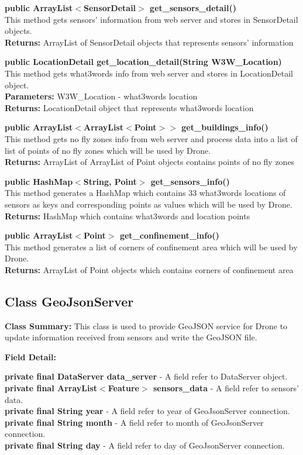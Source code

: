 \documentclass[12pt]{article}
\begin{document}
\textbf{public ArrayList$<$SensorDetail$>$ get\_sensors\_detail()}\\
This method gets sensors' information from web server and stores in SensorDetail objects.\\
\textbf{Returns:} ArrayList of SensorDetail objects that represents sensors' information

\textbf{public LocationDetail get\_location\_detail(String W3W\_Location)}\\
This method gets what3words info from web server and stores in LocationDetail object.\\
\textbf{Parameters:} W3W\_Location - what3words location\\
\textbf{Returns:} LocationDetail object that represents what3words location

\textbf{public ArrayList$<$ArrayList$<$Point$>>$ get\_buildings\_info()}\\
This method gets no fly zones info from web server and process data into a list of list of points of no fly zones which will be used by Drone.\\
\textbf{Returns:} ArrayList of ArrayList of Point objects contains points of no fly zones

\textbf{public HashMap$<$String, Point$>$ get\_sensors\_info()}\\
This method generates a HashMap which contains 33 what3words locations of sensors as keys and corresponding points as values which will be used by Drone.\\
\textbf{Returns:} HashMap which contains what3words and location points

\textbf{public ArrayList$<$Point$>$ get\_confinement\_info()}\\
This method generates a list of corners of confinement area which will be used by Drone.\\
\textbf{Returns:} ArrayList of Point objects which contains corners of confinement area

\subsection {Class GeoJsonServer}
\textbf{Class Summary:} This class is used to provide GeoJSON service for Drone to update information received from sensors and write the GeoJSON file.

\textbf{Field Detail:}

\textbf{private final DataServer data\_server} - A field refer to DataServer object.\\
\textbf{private final ArrayList$<$Feature$>$ sensors\_data} - A field refer to sensors' data.\\
\textbf{private final String year} - A field refer to year of GeoJsonServer connection.\\
\textbf{private final String month} - A field refer to month of GeoJsonServer connection.\\
\textbf{private final String day} - A field refer to day of GeoJsonServer connection.
\end{document}
